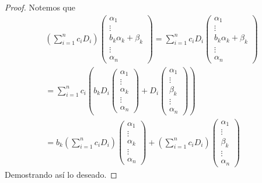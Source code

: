 \documentclass[12pt,a4paper]{book}
\newcommand{\parentesis}[1]{\left(#1\right)}
\begin{document}
    \begin{proof}
        Notemos que
        \begin{gather*}
        \parentesis{\sum_{i = 1}^nc_iD_i}
        \begin{pmatrix}
            \alpha_1\\
            \vdots\\
            b_k\alpha_k + \beta_k\\
            \vdots\\
            \alpha_n
        \end{pmatrix} = \sum_{i = 1}^nc_iD_i
        \begin{pmatrix}
            \alpha_1\\
            \vdots\\
            b_k\alpha_k + \beta_k\\
            \vdots\\
            \alpha_n
        \end{pmatrix}\\
        = \sum_{i = 1}^nc_i \parentesis{b_k D_i
        \begin{pmatrix}
            \alpha_1\\
            \vdots\\
            \alpha_k\\
            \vdots\\
            \alpha_n
        \end{pmatrix} + D_i 
        \begin{pmatrix}
            \alpha_1\\
            \vdots\\
            \beta_k\\
            \vdots\\
            \alpha_n
        \end{pmatrix}}\\
        = b_k \parentesis{\sum_{i = 1}^nc_iD_i}
        \begin{pmatrix}
             \alpha_1\\
             \vdots\\
             \alpha_k\\
             \vdots\\
             \alpha_n
        \end{pmatrix} + \parentesis{\sum_{i = 1}^nc_iD_i}
        \begin{pmatrix}
            \alpha_1\\
            \vdots\\
            \beta_k\\
            \vdots\\
            \alpha_n
        \end{pmatrix}   
        \end{gather*}
        Demostrando así lo deseado.
    \end{proof}
\end{document}
